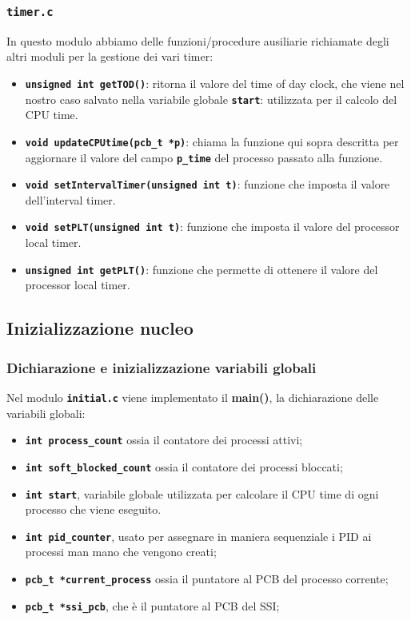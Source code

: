\documentclass{article}
\begin{document}
\subsubsection{\texttt{\textbf{timer.c}}}
In questo modulo abbiamo delle funzioni/procedure ausiliarie richiamate degli altri moduli per la gestione dei vari timer:
\begin{itemize}
  \item \texttt{\textbf{unsigned int getTOD()}}: ritorna il valore del time of day clock, che viene nel nostro caso salvato nella variabile globale \texttt{\textbf{start}}: utilizzata per il calcolo del CPU time.
    \item \texttt{\textbf{void updateCPUtime(pcb\_t *p)}}: chiama la funzione qui sopra descritta per aggiornare il valore 
      del campo \texttt{\textbf{p\_time}} del processo passato alla funzione.
    \item \texttt{\textbf{void setIntervalTimer(unsigned int t)}}: funzione che imposta il valore dell'interval timer. 
    \item \texttt{\textbf{void setPLT(unsigned int t)}}: funzione che imposta il valore del processor local timer.
    \item \texttt{\textbf{unsigned int getPLT()}}: funzione che permette di ottenere il valore del processor local timer.
\end{itemize}

\subsection{Inizializzazione nucleo}
\subsubsection{Dichiarazione e inizializzazione variabili globali}
Nel modulo \texttt{\textbf{initial.c}} viene implementato il \textbf{main()}, la dichiarazione delle variabili globali:
\begin{itemize}
    \item \texttt{\textbf{int process\_count}} ossia il contatore dei processi attivi;
    \item \texttt{\textbf{int soft\_blocked\_count}} ossia il contatore dei processi bloccati;
    \item \texttt{\textbf{int start}}, variabile globale utilizzata per calcolare il CPU time di ogni processo che viene eseguito.
    \item \texttt{\textbf{int pid\_counter}}, usato per assegnare in maniera sequenziale i PID ai processi man mano che vengono creati;
    \item \texttt{\textbf{pcb\_t *current\_process}} ossia il puntatore al PCB del processo corrente;
    \item \texttt{\textbf{pcb\_t *ssi\_pcb}}, che è il puntatore al PCB del SSI;
    
\end{itemize}
\end{document}
